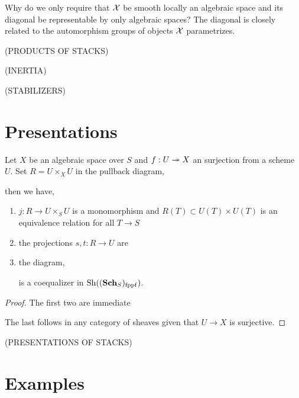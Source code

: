 \documentclass[12pt]{article}
\begin{document}
\begin{rmk}
Why do we only require that $\mathcal{X}$ be smooth locally an algebraic space and its diagonal be representable by only algebraic spaces? The diagonal is closely related to the automorphism groups of objects $\mathcal{X}$ parametrizes. 
\end{rmk}

(PRODUCTS OF STACKS)

(INERTIA)

(STABILIZERS)

\section{Presentations}

\begin{prop}
Let $X$ be an algebraic space over $S$ and $f : U \twoheadrightarrow X$ an \etale surjection from a scheme $U$. Set $R = U \times_X U$ in the pullback diagram,
\begin{center}
\end{center}
then we have,
\begin{enumerate}
\item $j : R \to U \times_S U$ is a monomorphism and $R(T) \subset U(T) \times U(T)$ is an equivalence relation for all $T \to S$
\item the projections $s,t : R \to U$ are \etale
\item the diagram,
\begin{center}
\end{center}
is a coequalizer in $\mathrm{Sh}((\mathbf{Sch}_S)_{\mathrm{fppf}})$. 
\end{enumerate}
\end{prop}

\begin{proof}
The first two are immediate 

The last follows in any category of sheaves given that $U \to X$ is surjective. 
\end{proof}

(PRESENTATIONS OF STACKS)

\section{Examples}
\end{document}
